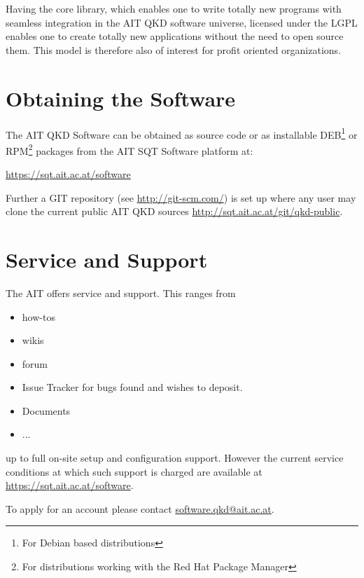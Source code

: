 \medskip

Having the core library, which enables one to write totally new programs with seamless integration in the AIT QKD software universe, licensed under the LGPL enables one to create totally new applications without the need to open source them. This model is therefore also of interest for profit oriented organizations.

\section{Obtaining the Software}
\label{sec:Obtaining the Software}

The AIT QKD Software can be obtained as source code or as installable DEB\footnote{For Debian based distributions} or RPM\footnote{For distributions working with the Red Hat Package Manager} packages from the AIT SQT Software platform at:

\medskip

\begin{center}
\url{https://sqt.ait.ac.at/software}
\end{center}

Further a GIT repository (see \href{http://git-scm.com}{http://git-scm.com/}) is set up where any user may clone the current public AIT QKD sources \url{http://sqt.ait.ac.at/git/qkd-public}. 

\section{Service and Support}
\label{sec:Service and Support}

The AIT offers service and support. This ranges from 

\begin{itemize}

    \item how-tos
    
    \item wikis
    
    \item forum
    
    \item Issue Tracker for bugs found and wishes to deposit.
    
    \item Documents
    
    \item ...

\end{itemize}

up to full on-site setup and configuration support. However the current service conditions at which such support is charged are available at \url{https://sqt.ait.ac.at/software}.

\medskip

To apply for an account please contact \href{mailto:software.qkd@ait.ac.at}{software.qkd@ait.ac.at}.
